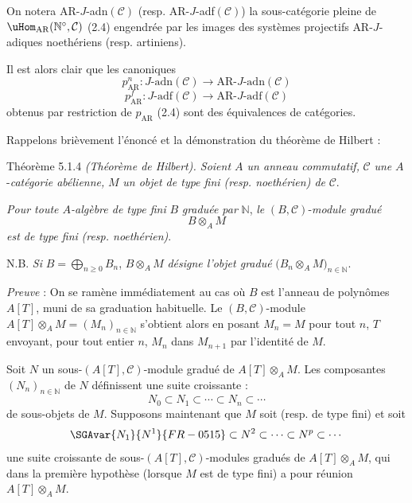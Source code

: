 On notera AR-\(J\)-adn\((\mathcal{C})\) (resp. AR-\(J\)-adf\((\mathcal{C})\)) la sous-catégorie pleine de \(\uHom_{\mathrm{AR}}(\mathbb{N}^\circ,\mathcal{C})\) (2.4) engendrée par les images des systèmes projectifs AR-\(J\)-adiques noethériens (resp. artiniens).

Il est alors clair que les  canoniques
\[
p^n_{\mathrm{AR}}:J\text{-adn}(\mathcal{C})\longrightarrow \mathrm{AR}\text{-}J\text{-adn}(\mathcal{C})
\]
\[
p^f_{\mathrm{AR}}:J\text{-adf}(\mathcal{C})\longrightarrow \mathrm{AR}\text{-}J\text{-adf}(\mathcal{C})
\]
obtenus par restriction de \(p_{\mathrm{AR}}\) (2.4) sont des équivalences de catégories.

Rappelons brièvement l'énoncé et la démonstration du théorème de Hilbert :

\begin{statement}{Théorème 5.1.4}
\emph{(Théorème de Hilbert). Soient \(A\) un anneau commutatif,} \(\mathcal{C}\) \emph{une} \(A\)-\emph{catégorie abélienne,} \(M\) \emph{un objet de type fini (resp. noethérien) de} \(\mathcal{C}\).

\emph{Pour toute \(A\)-algèbre de type fini} \(B\) \emph{graduée par} \(\mathbb{N}\), \emph{le} \((B,\mathcal{C})\)-\emph{module gradué}
\[
B\otimes_A M
\]
\emph{est de type fini} \emph{(resp. noethérien)}.

N.B. \emph{Si} \(B=\bigoplus_{n\ge0}B_n\), \(B\otimes_A M\) \emph{désigne l'objet gradué} \(\bigl(B_n\otimes_A M\bigr)_{n\in\mathbb{N}}\).
\end{statement}

\emph{Preuve} : On se ramène immédiatement au cas où \(B\) est l'anneau de polynômes \(A[T]\), muni de sa graduation habituelle. Le \((B,\mathcal{C})\)-module \(A[T]\otimes_A M=(M_n)_{n\in\mathbb{N}}\) s'obtient alors en posant \(M_n=M\) pour tout \(n\), \(T\) envoyant, pour tout entier \(n\), \(M_n\) dans \(M_{n+1}\) par l'identité de \(M\).

Soit \(N\) un sous-\((A[T],\mathcal{C})\)-module gradué de \(A[T]\otimes_A M\). Les composantes \((N_n)_{n\in\mathbb{N}}\) de \(N\) définissent une suite croissante :
\[
N_0\subset N_1\subset\cdots\subset N_n\subset\cdots
\]
de
sous-objets de \(M\). Supposons maintenant que \(M\) soit  (resp. de type fini) et soit
\[
\SGAvar{N_1}{N^1}{FR-0515}\subset N^2\subset\cdots\subset N^p\subset\cdots
\]
une suite croissante de sous-\((A[T],\mathcal{C})\)-modules gradués de \(A[T]\otimes_A M\), qui dans la première hypothèse (lorsque \(M\) est de type fini) a pour réunion \(A[T]\otimes_A M\).

